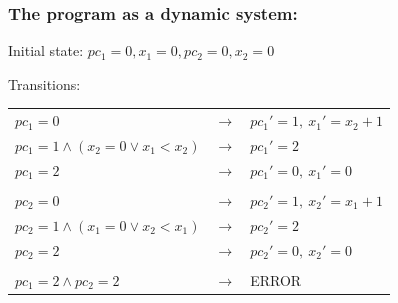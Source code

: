 \documentclass{beamer}
\begin{document}
\begin{frame}
  \frametitle{The program as a dynamic system:}

  Initial state: $pc_1 = 0, x_1 = 0, pc_2 = 0, x_2 = 0$\\
 
  \hfill

  Transitions:
  \begin{tabular}{lcl}
    $pc_1=0$ & $\rightarrow$ & $pc_1'=1,~ x_1' = x_2 + 1$ \\
    $pc_1=1 \land (x_2=0 \lor x_1<x_2)$ & $\rightarrow$ & $pc_1'=2$ \\
    $pc_1=2$ & $\rightarrow$ & $pc_1' = 0,~ x_1' = 0$ \\
    & & \\
    $pc_2=0$ & $\rightarrow$ & $pc_2'=1,~ x_2' = x_1 + 1$ \\
    $pc_2=1 \land (x_1=0 \lor x_2<x_1)$ & $\rightarrow$ & $pc_2'=2$ \\
    $pc_2=2$ & $\rightarrow$ & $pc_2' = 0,~ x_2' = 0$ \\
    & & \\
    $pc_1=2 \land pc_2=2$ & $\rightarrow$ & ERROR
  \end{tabular}

\end{frame}
\end{document}
